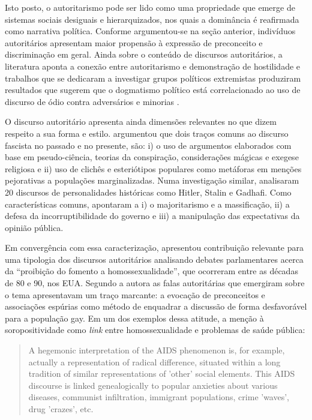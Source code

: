 \documentclass[
12pt,				%
openright,			%
twoside,			%
a4paper,			%
english,			%
french,				%
spanish,			%
brazil				%
]{abntex2}
\begin{document}
Isto posto, o autoritarismo pode ser lido como uma propriedade que emerge de sistemas sociais desiguais e hierarquizados, nos quais a dominância é reafirmada como narrativa política. Conforme argumentou-se na seção anterior, indivíduos autoritários apresentam maior propensão à expressão de preconceito e discriminação em geral. Ainda sobre o conteúdo de discursos autoritários, a literatura aponta a conexão entre autoritarismo e demonstração de hostilidade \cite{siegel1956relationship} e trabalhos que se dedicaram a investigar grupos políticos extremistas produziram resultados que sugerem que o dogmatismo político está correlacionado ao uso de discurso de ódio contra adversários e minorias \cite{gerstenfeld2003hate, ben2016hate}.  

O discurso autoritário apresenta ainda dimensões relevantes no que dizem respeito a sua forma e estilo.  argumentou que dois traços comuns ao discurso fascista no passado e no presente, são: i) o uso de argumentos elaborados com base em pseudo-ciência, teorias da conspiração, considerações mágicas e exegese religiosa e ii) uso de clichês e esteriótipos populares como metáforas em menções pejorativas a populações marginalizadas. Numa investigação similar,  analisaram 20 discursos de personalidades históricas como Hitler, Stalin e Gadhafi. Como características comuns, apontaram a i) o majoritarismo e a massificação, ii) a defesa da incorruptibilidade do governo e iii) a manipulação das expectativas da opinião pública.

Em convergência com essa caracterização,  apresentou contribuição relevante para uma tipologia dos discursos autoritários analisando debates parlamentares acerca da ``proibição do fomento a homossexualidade'', que ocorreram entre as décadas de 80 e 90, nos EUA. Segundo a autora as falas autoritárias que emergiram sobre o tema apresentavam um traço marcante: a evocação de preconceitos e associações espúrias como método de enquadrar a discussão de forma desfavorável para a população gay. Em um dos exemplos dessa atitude, a menção à soropositividade como \emph{link} entre homossexualidade e problemas de saúde pública:

\begin{quote}
	A hegemonic interpretation of the AIDS phenomenon is, for example, actually a representation of radical difference, situated within a long tradition of similar representations of 'other' social elements. This AIDS discourse is linked genealogically to popular anxieties about various diseases, communist infiltration, immigrant populations, crime 'waves', drug 'crazes', etc. \cite{smith2015advances}
\end{quote}
\end{document}
